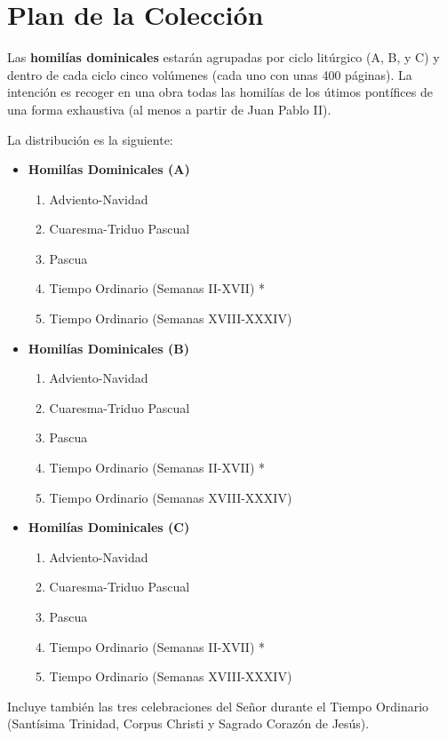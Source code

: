 \section {Plan de la Colección}


\begin{bodyintro}Las \textbf{homilías dominicales} estarán agrupadas por ciclo litúrgico (A, B, y C) y dentro de cada ciclo cinco volúmenes (cada uno con unas 400 páginas). La intención es recoger en una obra todas las homilías de los útimos pontífices de una forma exhaustiva (al menos a partir de Juan Pablo II).\end{bodyintro}

\begin{bodyintro}La distribución es la siguiente:\end{bodyintro}

\begin{itemize}
	\item \textbf {Homilías Dominicales (A)}
	\begin{enumerate}
		\renewcommand{\labelenumii}{\arabic{enumii}.}
		\item Adviento-Navidad
		\item Cuaresma-Triduo Pascual
		\item Pascua
		\item Tiempo Ordinario (Semanas II-XVII) *
		\item Tiempo Ordinario (Semanas XVIII-XXXIV)
	\end{enumerate}
\end{itemize}

\begin{itemize}
	\item \textbf {Homilías Dominicales (B)}
	\begin{enumerate}
		\renewcommand{\labelenumii}{\arabic{enumii}.}
		\item Adviento-Navidad
		\item Cuaresma-Triduo Pascual
		\item Pascua
		\item Tiempo Ordinario (Semanas II-XVII) *
		\item Tiempo Ordinario (Semanas XVIII-XXXIV)
	\end{enumerate}
\end{itemize}

\begin{itemize}
	\item \textbf {Homilías Dominicales (C)}
	\begin{enumerate}
		\renewcommand{\labelenumii}{\arabic{enumii}.}
		\item Adviento-Navidad
		\item Cuaresma-Triduo Pascual
		\item Pascua
		\item Tiempo Ordinario (Semanas II-XVII) *
		\item Tiempo Ordinario (Semanas XVIII-XXXIV)
	\end{enumerate}
\end{itemize}


\begin{bodyintro}\small *Incluye también las tres celebraciones del Señor durante el Tiempo Ordinario (Santísima Trinidad, Corpus Christi y Sagrado Corazón de Jesús).\end{bodyintro}
